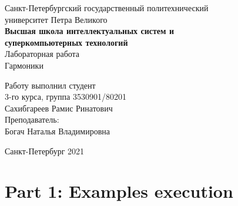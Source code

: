 \documentclass[a4paper]{article}
\begin{document}
    \begin{center}
        \begin{center}
        \hfill \break
        \normalsize{Санкт-Петербургский государственный политехнический}\\
        \normalsize{университет Петра Великого}\\
        \hfill \break
        \normalsize{\textbf{Высшая школа интеллектуальных систем и}}\\ 
        \normalsize{\textbf{суперкомпьютерных технологий}}\\ 
        \hfill \break
        \hfill \break
        \hfill \break
        \normalsize{Лабораторная работа}\\
        \hfill \break
        \hfill \break
        \normalsize{\LARGE Гармоники}\\
        \end{center}
        \hfill \break
        \hfill \break
        \hfill \break
        \hfill \break
        \hfill \break
        \hfill \break
        \hfill \break
        \hfill \break
        \hfill \break
        \hfill \break
        \begin{flushright}
            \normalsize{Работу выполнил студент}\\
            \normalsize{3-го курса, группа 3530901/80201}\\
            \normalsize{Сахибгареев Рамис Ринатович}\\
            \hfill \break
            \normalsize{Преподаватель:}\\
            \normalsize{Богач Наталья Владимировна}\\
        \end{flushright}
        \hfill \break
        \hfill \break
        \hfill \break
        \hfill \break
        \begin{center} Санкт-Петербург 2021 \end{center}
        \thispagestyle{empty}
    \end{center}
    
    \newpage
        \tableofcontents
    
    \newpage
         \listoffigures
    
    \newpage
         \lstlistoflistings   
     
    \newpage
        \section{Part 1: Examples execution}
        
\end{document}
